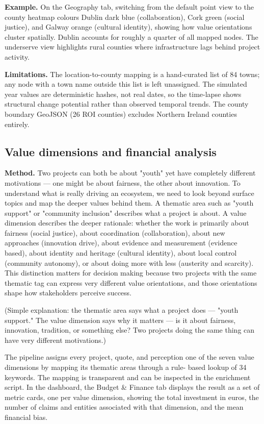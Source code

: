 \documentclass[11pt,a4paper]{article}
\begin{document}
\textbf{Example.} On the Geography tab, switching from the default point view
to the county heatmap colours Dublin dark blue (collaboration), Cork
green (social justice), and Galway orange (cultural identity), showing
how value orientations cluster spatially. Dublin accounts for roughly a
quarter of all mapped nodes. The underserve view highlights rural
counties where infrastructure lags behind project activity.

\textbf{Limitations.} The location-to-county mapping is a hand-curated list of
84 towns; any node with a town name outside this list is left
unassigned. The simulated year values are deterministic hashes, not real
dates, so the time-lapse shows structural change potential rather than
observed temporal trends. The county boundary GeoJSON (26 ROI counties)
excludes Northern Ireland counties entirely.

\subsection{Value dimensions and financial analysis}

\textbf{Method.} Two projects can both be about "youth" yet have completely
different motivations — one might be about fairness, the other about
innovation. To understand what is really driving an ecosystem, we need
to look beyond surface topics and map the deeper values behind them. A
thematic area such as "youth support" or "community inclusion" describes
what a project is about. A value dimension describes the deeper
rationale: whether the work is primarily about fairness
(social justice), about coordination (collaboration), about new
approaches (innovation drive), about evidence and measurement (evidence
based), about identity and heritage (cultural identity), about local
control (community autonomy), or about doing more with less (austerity
and scarcity). This distinction matters for decision making because two
projects with the same thematic tag can express very different value
orientations, and those orientations shape how stakeholders perceive
success.

(Simple explanation: the thematic area says what a project does — "youth
support." The value dimension says why it matters — is it about fairness,
innovation, tradition, or something else? Two projects doing the same
thing can have very different motivations.)

The pipeline assigns every project, quote, and perception one of the
seven value dimensions by mapping its thematic areas through a rule-
based lookup of 34 keywords. The mapping is transparent and can be
inspected in the enrichment script. In the dashboard, the Budget \&
Finance tab displays the result as a set of metric cards, one per value
dimension, showing the total investment in euros, the number of claims
and entities associated with that dimension, and the mean financial
bias.
\end{document}
